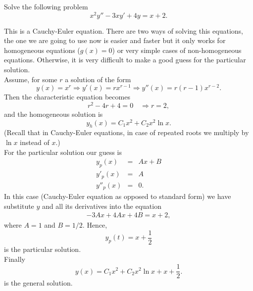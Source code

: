 \documentclass[11pt]{article}
\begin{document}
\begin{problem}
Solve the following problem
\begin{equation*}
     x^{2}y''-3xy'+4y=x+2.
\end{equation*}
\end{problem}
\begin{solution}
This is a Cauchy-Euler equation. There are two ways of solving this equations, the one we are going to use now is easier and faster but it only works for homogeneous equations ($g(x)=0$) or very simple cases of non-homogeneous equations. Otherwise, it is very difficult to make a good guess for the particular solution.\\
Assume, for some $r$ a solution of the form 
\[y(x)=x^{r}\Rightarrow y'(x)=rx^{r-1}\Rightarrow y''(x)=r(r-1)x^{r-2}.\]
Then the characteristic equation becomes
\[r^{2}-4r+4=0 \quad \Rightarrow r = 2,\]
and the homogeneous solution is
\[y_{h}(x)=C_{1}x^{2}+C_{2}x^{2}\ln x.\]
(Recall that in Cauchy-Euler equations, in case of repeated roots we multiply by $\ln x$ instead of $x$.)\\
For the particular solution our guess is
\begin{eqnarray*}
y_{p}(x) & = & Ax + B \\
y'_{p}(x) & = & A \\
y''_{p}(x) & = & 0.
\end{eqnarray*}
In this case (Cauchy-Euler equation as opposed to standard form) we have substitute $y$ and all its derivatives into the equation 
\begin{equation*} \begin{split}
 -3Ax + 4 A x +4B = x+2,
\end{split}
\end{equation*}
where $A=1$ and $B =1/2$. Hence, 
$$y_{p}(t) = x + \frac{1}{2}$$ 
is the particular solution.\\
Finally 
\[\boxed{y(x)=C_{1} x^{2}+ C_{2}x^{2}\ln x + x +\frac{1}{2}}.\]
is the general solution.
\end{solution}
\end{document}
